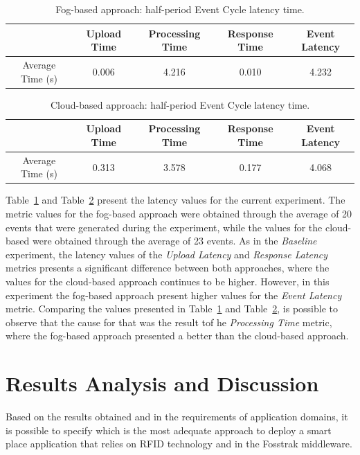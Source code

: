 \begin{table}[ht!]
  \begin{tabular}{|c|c|c|c|c|}
  \hline
  ~                & Upload Time & Processing Time & Response Time & Event Latency \\ \hline
  Average Time (s) & 0.006       & 4.216           & 0.010         & 4.232         \\ \hline
  \end{tabular}
  \caption{Fog-based approach: half-period Event Cycle latency time.}
  \label{table:ecspec_fast_local}
\end{table}

\begin{table}[ht!]
  \begin{tabular}{|c|c|c|c|c|}
  \hline
  ~                & Upload Time & Processing Time & Response Time & Event Latency \\ \hline
  Average Time (s) & 0.313       & 3.578           &  0.177        & 4.068         \\ \hline
  \end{tabular}
  \caption{Cloud-based approach: half-period Event Cycle latency time.}
  \label{table:ecspec_fast_cloud}
\end{table}

Table~\ref{table:ecspec_fast_local} and Table~\ref{table:ecspec_fast_cloud} present the latency values for the
current experiment. The metric values for the fog-based approach were obtained through the average
of 20 events that were generated during the experiment, while the values for the cloud-based were
obtained through the average of 23 events. As in the \textit{Baseline} experiment, the latency values
of the \textit{Upload Latency} and \textit{Response Latency} metrics presents a significant difference
between both approaches, where the values for the cloud-based approach continues to be higher.
However, in this experiment the fog-based approach present higher values for the \textit{Event Latency}
metric. Comparing the values presented in Table~\ref{table:ecspec_fast_local} and Table~\ref{table:ecspec_fast_cloud},
is possible to observe that the cause for that was the result tof he \textit{Processing Time}
metric, where the fog-based approach presented a better than the cloud-based approach.

\section{Results Analysis and Discussion}
\label{sec:eval_analysis}
Based on the results obtained and in the requirements of application domains, it is possible to specify
which is the most adequate approach to deploy a smart place application that relies on \gls{RFID}
technology and in the Fosstrak middleware.


